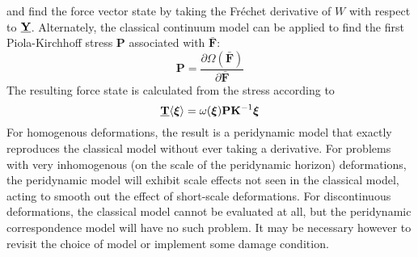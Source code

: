 and find the force vector state by taking the Fr\'echet derivative of $W$ with respect to $\vstate{Y}{}{}$.
Alternately, the classical continuum model can be applied to find the first Piola-Kirchhoff stress $\mathbf{P}$ associated with $\bar{\mathbf{F}}$:
\begin{equation}
\mathbf{P}=\frac{\partial\Omega(\bar{\mathbf{F}})}{\partial\bar{\mathbf{F}}}
\end{equation}
The resulting force state is calculated from the stress according to
\begin{equation}
\vstate{T}{}{\boldsymbol{\xi}} = \omega(\boldsymbol{\xi})\mathbf{P}\mathbf{K}^{-1}\boldsymbol{\xi}
\end{equation}
For homogenous deformations, the result is a peridynamic model that exactly reproduces the classical model without ever taking a derivative.
For problems with very inhomogenous (on the scale of the peridynamic horizon) deformations, the peridynamic model will exhibit scale effects not seen in the classical model, acting to smooth out the effect of short-scale deformations.
For discontinuous deformations, the classical model cannot be evaluated at all, but the peridynamic correspondence model will have no such problem.
It may be necessary however to revisit the choice of model or implement some damage condition.
